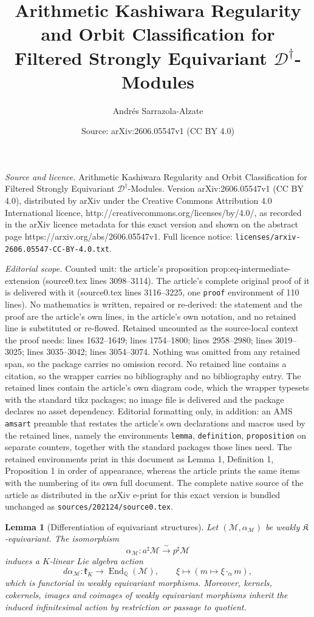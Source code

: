 \documentclass[10pt,a4paper]{amsart}
\title{Arithmetic Kashiwara Regularity and Orbit Classification for Filtered Strongly Equivariant $\mathcal{D}^{\dagger}$-Modules}
\author{Andr\'es Sarrazola-Alzate}
\date{Source: arXiv:2606.05547v1 (CC BY 4.0)}
\newtheorem{lemma}{Lemma}
\begin{document}
\maketitle

\noindent\emph{Source and licence.} Arithmetic Kashiwara Regularity and Orbit Classification for Filtered Strongly Equivariant $\mathcal{D}^{\dagger}$-Modules. Version arXiv:2606.05547v1 (CC BY 4.0), distributed by arXiv under the Creative Commons Attribution 4.0 International licence, http://creativecommons.org/licenses/by/4.0/, as recorded in the arXiv licence metadata for this exact version and shown on the abstract page https://arxiv.org/abs/2606.05547v1. Full licence notice: \texttt{licenses/arxiv-2606.05547-CC-BY-4.0.txt}.\par\smallskip

\noindent\textit{Editorial scope.} Counted unit: the article's proposition prop:eq-intermediate-extension (source0.tex lines 3098--3114). The article's complete original proof of it is delivered with it (source0.tex lines 3116--3225, one \texttt{proof} environment of 110 lines). No mathematics is written, repaired or re-derived: the statement and the proof are the article's own lines, in the article's own notation, and no retained line is substituted or re-flowed.  Retained uncounted as the source-local context the proof needs: lines 1632--1649; lines 1754--1800; lines 2958--2980; lines 3019--3025; lines 3035--3042; lines 3054--3074.  Nothing was omitted from any retained span, so the package carries no omission record.  No retained line contains a citation, so the wrapper carries no bibliography and no bibliography entry.  The retained lines contain the article's own diagram code, which the wrapper typesets with the standard tikz packages; no image file is delivered and the package declares no asset dependency.  Editorial formatting only, in addition: an AMS \texttt{amsart} preamble that restates the article's own declarations and macros used by the retained lines, namely the environments \texttt{lemma}, \texttt{definition}, \texttt{proposition} on separate counters, together with the standard packages those lines need.  The retained environments print in this document as Lemma 1, Definition 1, Proposition 1 in order of appearance, whereas the article prints the same items with the numbering of its own full document.  The complete native source of the article as distributed in the arXiv e-print for this exact version is bundled unchanged as \texttt{sources/202124/source0.tex}.
\begin{lemma}[Differentiation of equivariant structures]
\label{lem:differentiation-equivariant-structures}
Let \((\mathcal M,\alpha_{\mathcal M})\) be weakly
\(\mathfrak K\)-equivariant.  The isomorphism
\[
  \alpha_{\mathcal M}:a^\sharp\mathcal M\xrightarrow{\sim}p^\sharp\mathcal M
\]
induces a \(K\)-linear Lie algebra action
\[
  d\alpha_{\mathcal M}:\mathfrak k_K\longrightarrow
  \operatorname{End}_{\mathbb Q}(\mathcal M),
  \qquad
  \xi\longmapsto (m\mapsto \xi\cdot_\alpha m),
\]
which is functorial in weakly equivariant morphisms.  Moreover, kernels,
cokernels, images and coimages of weakly equivariant morphisms inherit the
induced infinitesimal action by restriction or passage to quotient.
\end{lemma}
\end{document}
